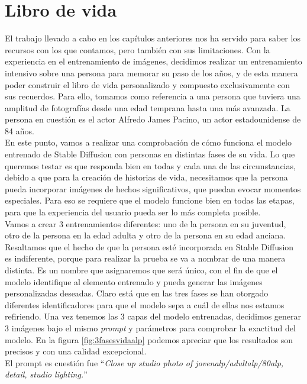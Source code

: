 \chapter{Libro de vida}
\label{cap:librodevida}

El trabajo llevado a cabo en los capítulos anteriores nos ha servido para saber los recursos con los que contamos, pero también con sus limitaciones. Con la experiencia en el entrenamiento de imágenes, decidimos realizar un entrenamiento intensivo sobre una persona para memorar su paso de los años, y de esta manera poder construir el libro de vida personalizado y compuesto exclusivamente con sus recuerdos. Para ello, tomamos como referencia a una persona que tuviera una amplitud de fotografías desde una edad temprana hasta una más avanzada. La persona en cuestión es el actor Alfredo James Pacino, un actor estadounidense de 84 años.\\

En este punto, vamos a realizar una comprobación de cómo funciona el modelo entrenado de Stable Diffusion con personas en distintas fases de su vida. Lo que queremos testar es que responda bien en todas y cada una de las circunstancias, debido a que para la creación de historias de vida, necesitamos que la persona pueda incorporar imágenes de hechos significativos, que puedan evocar momentos especiales. Para eso se requiere que el modelo funcione bien en todas las etapas, para que la experiencia del usuario pueda ser lo más completa posible.\\

Vamos a crear 3 entrenamientos diferentes: uno de la persona en su juventud, otro de la persona en la edad adulta y otro de la persona en su edad anciana. Resaltamos que el hecho de que la persona esté incorporada en Stable Diffusion es indiferente, porque para realizar la prueba se va a nombrar de una manera distinta. Es un nombre que asignaremos que será único, con el fin de que el modelo identifique al elemento entrenado y pueda generar las imágenes personalizadas deseadas. Claro está que en las tres fases se han otorgado diferentes identificadores para que el modelo sepa a cuál de ellas nos estamos refiriendo. Una vez tenemos las 3 capas del modelo entrenadas, decidimos generar 3 imágenes bajo el mismo \textit{prompt} y parámetros para comprobar la exactitud del modelo. En la figura \ref{fig:3fasesvidaalp} podemos apreciar que los resultados son precisos y con una calidad excepcional.\\
 
El prompt es cuestión fue ``\textit{Close up studio photo of jovenalp/adultalp/80alp, detail, studio lighting.}''

